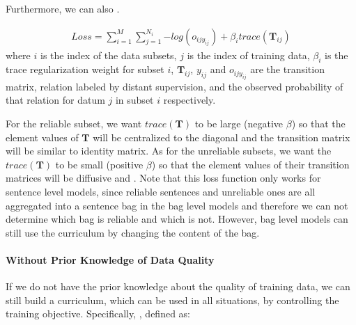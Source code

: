 Furthermore, we can also . 

\begin{equation}
\begin{aligned}
Loss=\sum_{i=1}^M{\sum_{j=1}^{N_i}{-log(o_{ijy_{ij}})}} + \beta_i trace(\mathbf{T}_{ij})
\end{aligned}
\end{equation}
where $i$ is the index of the data subsets, $j$ is the index of training data, $\beta_i$ is the trace regularization weight for subset $i$, $\mathbf{T}_{ij}$, $y_{ij}$ and $o_{ijy_{ij}}$ are the transition matrix, relation labeled by distant supervision, and the observed probability of that relation for datum $j$ in subset $i$ respectively.

For the reliable subset, we want $trace(\mathbf{T})$ to be large (negative $\beta$) so that the element values of $\mathbf{T}$ will be centralized to the diagonal and the transition matrix will be similar to identity matrix. As for the unreliable subsets, we want the $trace(\mathbf{T})$ to be small (positive $\beta$) so that the element values of their transition matrices will be diffusive and . Note that this loss function only works for sentence level models, since reliable sentences and unreliable ones are all aggregated into a sentence bag in the bag level models and therefore we can not determine which bag is reliable and which is not. However, bag level models can still use the curriculum by changing the content of the bag. 

\paragraph{Without Prior Knowledge of Data Quality}
\label{curr_over_data}
If we do not have the prior knowledge about the quality of training data, we can still build a curriculum, which can be used in all situations, by controlling the training objective. Specifically, , defined as:

